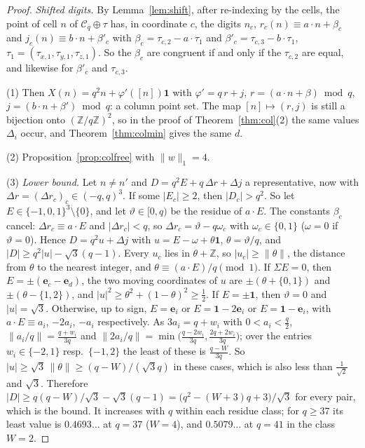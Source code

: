 \documentclass[11pt]{amsart}
\theoremstyle{definition}
\theoremstyle{plain}
\newcommand{\Z}{\mathbb{Z}}
\newcommand{\e}{\mathbf{e}}
\begin{document}
\begin{proof}
\emph{Shifted digits.} By Lemma~\ref{lem:shift}, after re-indexing by the cells, the point of cell $n$ of $\mathcal C_q\oplus\tau$ has, in coordinate $c$, the digits $n_c$, $r_c(n)\equiv a\cdot n+\beta_c$ and $j_c(n)\equiv b\cdot n+\beta'_c$ with $\beta_c=\tau_{c,2}-a\cdot\tau_1$ and $\beta'_c=\tau_{c,3}-b\cdot\tau_1$, $\tau_1=(\tau_{x,1},\tau_{y,1},\tau_{z,1})$. So the $\beta_c$ are congruent if and only if the $\tau_{c,2}$ are equal, and likewise for $\beta'_c$ and $\tau_{c,3}$.

(1) Then $X(n)=q^2n+\varphi'([n])\mathbf 1$ with $\varphi'=q\,r+j$, $r=(a\cdot n+\beta)\bmod q$, $j=(b\cdot n+\beta')\bmod q$: a column point set. The map $[n]\mapsto(r,j)$ is still a bijection onto $(\Z/q\Z)^2$, so in the proof of Theorem~\ref{thm:col}(2) the same values $\Delta_i$ occur, and Theorem~\ref{thm:colmin} gives the same $d$.

(2) Proposition~\ref{prop:colfree} with $\|w\|_1=4$.

(3) \emph{Lower bound.} Let $n\ne n'$ and $D=q^2E+q\,\Delta r+\Delta j$ a representative, now with $\Delta r=(\Delta r_c)_c\in(-q,q)^3$. If some $|E_c|\ge2$, then $|D_c|>q^2$. So let $E\in\{-1,0,1\}^3\setminus\{0\}$, and let $\vartheta\in[0,q)$ be the residue of $a\cdot E$. The constants $\beta_c$ cancel: $\Delta r_c\equiv a\cdot E$ and $|\Delta r_c|<q$, so $\Delta r_c=\vartheta-q\omega_c$ with $\omega_c\in\{0,1\}$ ($\omega=0$ if $\vartheta=0$). Hence $D=q^2u+\Delta j$ with $u=E-\omega+\theta\mathbf 1$, $\theta=\vartheta/q$, and $|D|\ge q^2|u|-\sqrt3(q-1)$. Every $u_c$ lies in $\theta+\Z$, so $|u_c|\ge\|\theta\|$, the distance from $\theta$ to the nearest integer, and $\theta\equiv(a\cdot E)/q\pmod1$. If $\Sigma E=0$, then $E=\pm(\e_c-\e_d)$, the two moving coordinates of $u$ are $\pm(\theta+\{0,1\})$ and $\pm(\theta-\{1,2\})$, and $|u|^2\ge\theta^2+(1-\theta)^2\ge\frac12$. If $E=\pm\mathbf 1$, then $\vartheta=0$ and $|u|=\sqrt3$. Otherwise, up to sign, $E=\e_i$ or $E=\mathbf 1-2\e_i$ or $E=\mathbf 1-\e_i$, with $a\cdot E\equiv a_i$, $-2a_i$, $-a_i$ respectively. As $3a_i=q+w_i$ with $0<a_i<\frac q2$, $\|a_i/q\|=\frac{q+w_i}{3q}$ and $\|2a_i/q\|=\min\bigl(\frac{q-2w_i}{3q},\frac{2q+2w_i}{3q}\bigr)$; over the entries $w_i\in\{-2,1\}$ resp.\ $\{-1,2\}$ the least of these is $\frac{q-W}{3q}$. So $|u|\ge\sqrt3\,\|\theta\|\ge(q-W)/(\sqrt3q)$ in these cases, which is also less than $\frac1{\sqrt2}$ and $\sqrt3$. Therefore $|D|\ge q(q-W)/\sqrt3-\sqrt3(q-1)=\bigl(q^2-(W+3)q+3\bigr)/\sqrt3$ for every pair, which is the bound. It increases with $q$ within each residue class; for $q\ge37$ its least value is $0.4693\ldots$ at $q=37$ ($W=4$), and $0.5079\ldots$ at $q=41$ in the class $W=2$.


\end{proof}
\end{document}
